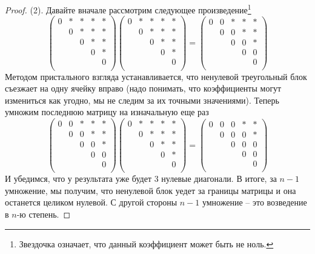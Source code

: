 \begin{proof}
(2). Давайте вначале рассмотрим следующее произведение\footnote{Звездочка означает, что данный коэффициент может быть не ноль.}
\[
\begin{pmatrix}
{0}&{*}&{*}&{*}&{*}\\
{}&{0}&{*}&{*}&{*}\\
{}&{}&{0}&{*}&{*}\\
{}&{}&{}&{0}&{*}\\
{}&{}&{}&{}&{0}\\
\end{pmatrix}
\begin{pmatrix}
{0}&{*}&{*}&{*}&{*}\\
{}&{0}&{*}&{*}&{*}\\
{}&{}&{0}&{*}&{*}\\
{}&{}&{}&{0}&{*}\\
{}&{}&{}&{}&{0}\\
\end{pmatrix}
=
\begin{pmatrix}
{0}&{0}&{*}&{*}&{*}\\
{}&{0}&{0}&{*}&{*}\\
{}&{}&{0}&{0}&{*}\\
{}&{}&{}&{0}&{0}\\
{}&{}&{}&{}&{0}\\
\end{pmatrix}
\]
Методом пристального взгляда устанавливается, что ненулевой треугольный блок съезжает на одну ячейку вправо (надо понимать, что коэффициенты могут измениться как угодно, мы не следим за их точными значениями). Теперь умножим последнюю матрицу на изначальную еще раз
\[
\begin{pmatrix}
{0}&{0}&{*}&{*}&{*}\\
{}&{0}&{0}&{*}&{*}\\
{}&{}&{0}&{0}&{*}\\
{}&{}&{}&{0}&{0}\\
{}&{}&{}&{}&{0}\\
\end{pmatrix}
\begin{pmatrix}
{0}&{*}&{*}&{*}&{*}\\
{}&{0}&{*}&{*}&{*}\\
{}&{}&{0}&{*}&{*}\\
{}&{}&{}&{0}&{*}\\
{}&{}&{}&{}&{0}\\
\end{pmatrix}
=
\begin{pmatrix}
{0}&{0}&{0}&{*}&{*}\\
{}&{0}&{0}&{0}&{*}\\
{}&{}&{0}&{0}&{0}\\
{}&{}&{}&{0}&{0}\\
{}&{}&{}&{}&{0}\\
\end{pmatrix}
\]
И убедимся, что у результата уже будет $3$ нулевые диагонали. В итоге, за $n-1$ умножение, мы получим, что ненулевой блок уедет за границы матрицы и она останется целиком нулевой. С другой стороны $n-1$ умножение -- это возведение в $n$-ю степень.
\end{proof}

